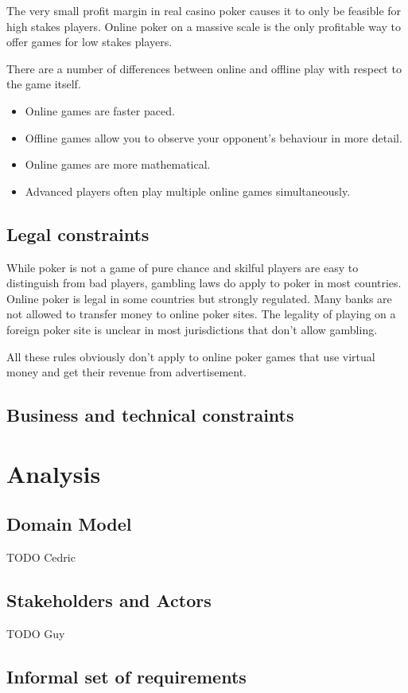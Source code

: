 \documentclass[a4paper,11pt]{report}
\begin{document}
The very small profit margin in real casino poker causes it to only be feasible for high stakes players. Online poker on a massive scale is the only profitable way to offer games for low stakes players.

There are a number of differences between online and offline play with respect to the game itself.
\begin{itemize}
 \item Online games are faster paced.
 \item Offline games allow you to observe your opponent's behaviour in more detail.
 \item Online games are more mathematical.
 \item Advanced players often play multiple online games simultaneously.
\end{itemize}

\section{Legal constraints}
While poker is not a game of pure chance and skilful players are easy to distinguish from bad players, gambling laws do apply to poker in most countries. Online poker is legal in some countries but strongly regulated. Many banks are not allowed to transfer money to online poker sites. The legality of playing on a foreign poker site is unclear in most jurisdictions that don't allow gambling.

All these rules obviously don't apply to online poker games that use virtual money and get their revenue from advertisement.

\section{Business and technical constraints}


\chapter{Analysis}
\section{Domain Model}
TODO Cedric
\section{Stakeholders and Actors}
TODO Guy
\section{Informal set of requirements}
\end{document}
